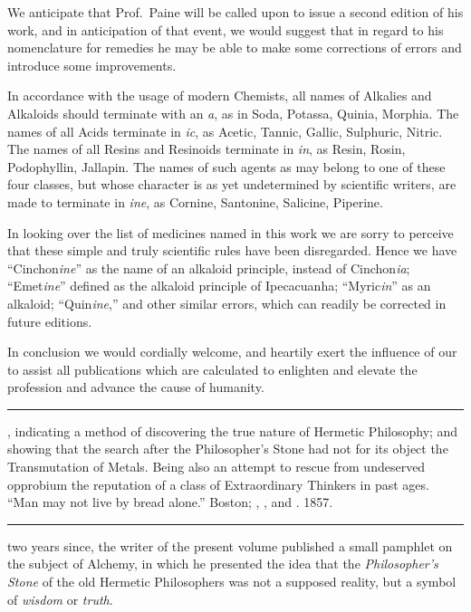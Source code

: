 
We anticipate that Prof.\ Paine will be called upon to issue a second
edition of his work, and in anticipation of that event, we would suggest
that in regard to his nomenclature for remedies he may be able to
make some corrections of errors and introduce some improvements.

In accordance with the usage of modern Chemists, all names of
Alkalies and Alkaloids should terminate with an \emph{a}, as in Soda, Potassa,
Quinia, Morphia. The names of all Acids terminate in \emph{ic}, as Acetic,
Tannic, Gallic, Sulphuric, Nitric. The names of all Resins and Resinoids
terminate in \emph{in}, as Resin, Rosin, Podophyllin, Jallapin. The
names of such agents as may belong to one of these four classes, but
whose character is as yet undetermined by scientific writers, are made
to terminate in \emph{ine}, as Cornine, Santonine, Salicine, Piperine.

In looking over the list of medicines named in this work we are sorry
to perceive that these simple and truly scientific rules have been disregarded.
Hence we have ``Cinchon\textit{ine}'' as the name of an alkaloid
principle, instead of Cinchon\textit{ia}; ``Emet\textit{ine}'' defined as the alkaloid
principle of Ipecacuanha; ``Myric\textit{in}'' as an alkaloid; ``Quin\textit{ine},''
and other similar errors, which can readily be corrected in future editions.

In conclusion we would cordially welcome, and heartily exert the influence
of our  to assist all publications which are calculated to
enlighten and elevate the profession and advance the cause of humanity.

\fancybreak{* * *}

\footnotesize
{}, indicating a method of discovering the true
nature of Hermetic Philosophy; and showing that the search after the Philosopher's
Stone had not for its object the Transmutation of Metals. Being also an attempt to
rescue from undeserved opprobium the reputation of a class of Extraordinary Thinkers
in past ages. ``Man may not live by bread alone.'' Boston; , , and
. 1857.
\plainbreak{1}
\normalsize


 two years since, the writer of the present volume published a
small pamphlet on the subject of Alchemy, in which he presented the
idea that the \emph{Philosopher's Stone} of the old Hermetic Philosophers
was not a supposed reality, but a symbol of \emph{wisdom} or \emph{truth}.


